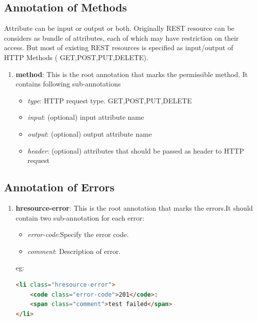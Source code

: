 \documentclass[journal]{IEEEtran}
\begin{document}
\subsection{Annotation of Methods}
Attribute can be input or output or both. Originally REST resource can be considers as bundle of attributes, each of which may have restriction on their access. But most of existing REST resources is specified as input/output of HTTP Methods ( GET,POST,PUT,DELETE).   

\begin{enumerate}
\item {\bf method}: This is the root annotation that marks the permissible method. It contains following sub-annotations
\begin{itemize}
\item {\it type}: HTTP request type. GET,POST,PUT,DELETE
\item {\it input}:  (optional) input attribute name
\item {\it output}: (optional) output attribute name
\item {\it header}: (optional) attributes that should be passed as header to HTTP request
\end{itemize}
\end{enumerate}

\subsection{Annotation of Errors}

\begin{enumerate}
\item {\bf hresource-error}: This is the root annotation that marks the errors.It should contain two sub-annotation for each error:
\begin{itemize}
\item {\it error-code}:Specify the error code.
\item {\it comment}: Description of error.
\end{itemize}
eg:
\begin{lstlisting}[language=html,breaklines=true]
<li class="hresource-error">
    <code class="error-code">201</code>:
    <span class="comment">test failed</span>
</li>
\end{lstlisting}
\end{enumerate}
\end{document}
